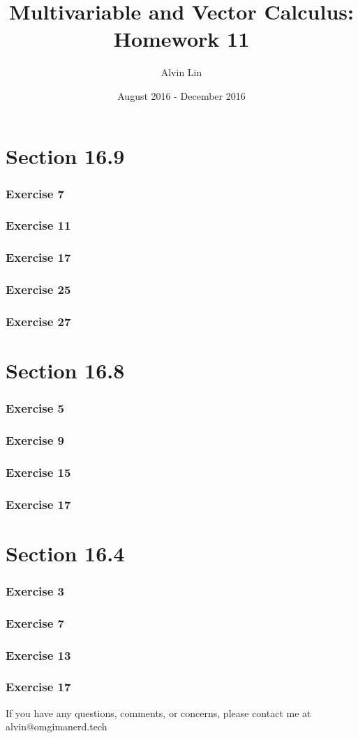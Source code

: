 \documentclass{math}
\title{Multivariable and Vector Calculus: Homework 11}
\author{Alvin Lin}
\date{August 2016 - December 2016}
\begin{document}
\maketitle

\section*{Section 16.9}

\subsubsection*{Exercise 7}
\subsubsection*{Exercise 11}
\subsubsection*{Exercise 17}
\subsubsection*{Exercise 25}
\subsubsection*{Exercise 27​}

\section*{Section 16.8}

\subsubsection*{Exercise 5}
\subsubsection*{Exercise 9}
\subsubsection*{Exercise 15}
\subsubsection*{Exercise 17}

\section*{Section 16.4}

\subsubsection*{Exercise 3}
\subsubsection*{Exercise 7}
\subsubsection*{Exercise 13}
\subsubsection*{Exercise 17​}

\begin{center}
  If you have any questions, comments, or concerns, please contact me at
  alvin@omgimanerd.tech
\end{center}
\end{document}
